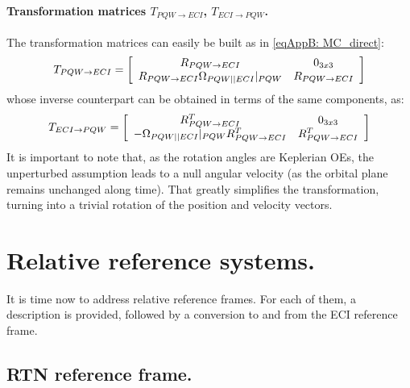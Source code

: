 			\paragraph{Transformation matrices $T_{PQW\rightarrow ECI}$, $T_{ECI\rightarrow PQW}$. \\}
			\indent The transformation matrices can easily be built as in \eqref{eqAppB: 	MC_direct}:
			\[
			 T_{PQW\to ECI} = \left[\begin{array}{cc}
	R_{PQW\to ECI} & 0_{3x3} \\
	R_{PQW\to ECI} \Omega_{PQW \vert \vert ECI}\rvert_{PQW} & R_{PQW\to ECI}
	\end{array}\right]
			\]
			\noindent whose inverse counterpart can be obtained in terms of the same components, as:
			\[
			 T_{ECI\to PQW} = \left[\begin{array}{cc}
	R_{PQW\to ECI}^T & 0_{3x3} \\
	-\Omega_{PQW \vert \vert ECI}\rvert_{PQW} R_{PQW\to ECI}^T & R_{PQW\to ECI}^T
	\end{array}\right]
			\]
			\indent It is important to note that, as the rotation angles are Keplerian OEs, the unperturbed assumption leads to a null angular velocity (as the orbital plane remains unchanged along time). That greatly simplifies the transformation, turning into a trivial rotation of the position and velocity vectors.
		
\section{Relative reference systems.}
%
\indent It is time now to address relative reference frames. For each of them, a description is provided, followed by a conversion to and from the ECI reference frame. 
%
	\subsection{RTN reference frame.}
